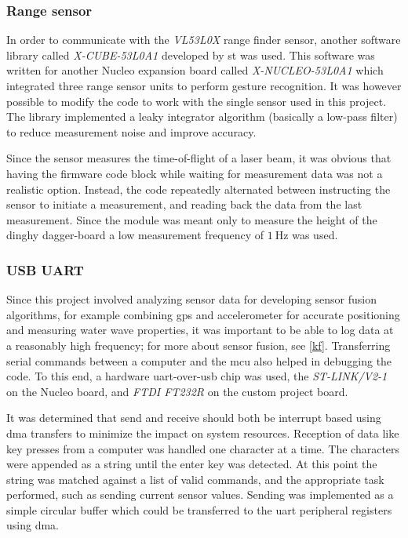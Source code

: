 \subsubsection{Range sensor}
In order to communicate with the \emph{VL53L0X} range finder sensor, another software library called \emph{X-CUBE-53L0A1}\cite{x-cube-53l0a} developed by \gls{st} was used. This software was written for another Nucleo expansion board called \emph{X-NUCLEO-53L0A1} which integrated three range sensor units to perform gesture recognition. It was however possible to modify the code to work with the single sensor used in this project. The library implemented a leaky integrator algorithm (basically a low-pass filter) to reduce measurement noise and improve accuracy.

Since the sensor measures the time-of-flight of a laser beam, it was obvious that having the firmware code block while waiting for measurement data was not a realistic option. Instead, the code repeatedly alternated between instructing the sensor to initiate a measurement, and reading back the data from the last measurement. Since the module was meant only to measure the height of the dinghy dagger-board  a low measurement frequency of $1~\textrm{Hz}$ was used.

\subsubsection{USB UART}
\label{usb-uart}
Since this project involved analyzing sensor data for developing sensor fusion algorithms, for example combining \gls{gps} and accelerometer for accurate positioning and measuring water wave properties, it was important to be able to log data at a reasonably high frequency; for more about sensor fusion, see \autoref{kf}. Transferring serial commands between a computer and the \gls{mcu} also helped in debugging the code. To this end, a hardware \gls{uart}-over-\gls{usb} chip was used, the \emph{ST-LINK/V2-1} on the Nucleo board, and \emph{FTDI FT232R} on the custom project board.

It was determined that send and receive should both be interrupt based using \gls{dma} transfers to minimize the impact on system resources. Reception of data like key presses from a computer was handled one character at a time. The characters were appended as a string until the enter key was detected. At this point the string was matched against a list of valid commands, and the appropriate task performed, such as sending current sensor values. Sending was implemented as a simple circular buffer which could be transferred to the \gls{uart} peripheral registers using \gls{dma}.

